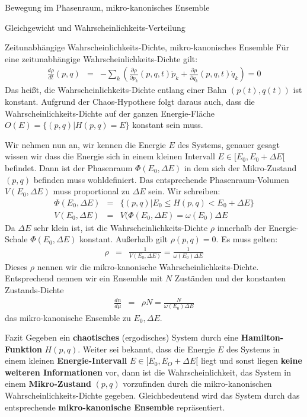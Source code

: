 \begin{chapter}{\titlestr}
\begin{section}{Bewegung im Phasenraum, mikro-kanonisches Ensemble}
\begin{subsection}{Gleichgewicht und Wahrscheinlichkeits-Verteilung}
\begin{subsubsection}{Zeitunabhängige Wahrscheinlichkeits-Dichte, mikro-kanonisches Ensemble}
Für eine zeitunabhängige Wahrscheinlichkeits-Dichte gilt:
\begin{eqnarray*}
\frac{d\rho}{dt}(p,q) &=& -\sum_k\left(\frac{\partial \rho}{\partial \dot{p}_k}(p,q,t)\dot{p}_k
+\frac{\partial \rho}{\partial \dot{q}_k}(p,q,t)\dot{q}_k
\right) =0
\end{eqnarray*}
Das heißt, die Wahrscheinlichkeits-Dichte entlang einer Bahn $(p(t),q(t))$ ist konstant.
Aufgrund der Chaos-Hypothese
folgt daraus auch, dass die Wahrscheinlichkeits-Dichte auf der ganzen Energie-Fläche $O(E)=\{(p,q)|H(p,q)=E\}$ konstant sein muss.
 
Wir nehmen nun an, wir kennen die Energie $E$ des Systems, genauer gesagt wissen wir dass die Energie
sich in einem kleinen Intervall $E\in [E_0,E_0+\Delta E[$ befindet. Dann ist der Phasenraum $\Phi(E_0,\Delta E)$
in dem sich der Mikro-Zustand $(p,q)$ befinden muss wohldefiniert. Das entsprechende Phasenraum-Volumen $V(E_0,\Delta E)$ muss proportional zu $\Delta E$ sein. Wir schreiben:
\begin{eqnarray}
\label{omega_def}
\Phi(E_0,\Delta E) &=& \{ (p,q) | E_0 \le H(p,q) < E_0+\Delta E\}\\
V(E_0,\Delta E) &=& V(\Phi(E_0,\Delta E) = \omega(E_0)\Delta E
\end{eqnarray}
Da $\Delta E$ sehr klein ist, ist die Wahrscheinlichkeits-Dichte $\rho$ innerhalb der Energie-Schale $\Phi(E_0,\Delta E)$ konstant.
Außerhalb gilt $\rho(p,q)=0$. Es muss gelten:
\begin{eqnarray*}
\rho &=& \frac{1}{V(E_0,\Delta E)}=\frac{1}{\omega(E_0)\Delta E}
\end{eqnarray*}
Dieses $\rho$ nennen wir die mikro-kanonische  Wahrscheinlichkeits-Dichte. Entsprechend nennen wir ein Ensemble mit $N$ Zuständen und der konstanten Zustands-Dichte
\begin{eqnarray*}
\frac{dn}{d\mu} &=& \rho N=\frac{N}{\omega(E_0)\Delta E}
\end{eqnarray*}
das mikro-kanonische Ensemble zu $E_0,\Delta E$.
\end{subsubsection}
\end{subsection}

\begin{subsection}{Fazit}
Gegeben ein \textbf{chaotisches} (ergodisches) System durch eine \textbf{Hamilton-Funktion} $H(p,q)$. Weiter sei bekannt, dass die Energie $E$
des Systems in einem kleinen \textbf{Energie-Intervall} $E\in [E_0, E_O+\Delta E[$ liegt und sonst liegen \textbf{keine weiteren Informationen} vor, dann ist die Wahrscheinlichkeit, das System in einem \textbf{Mikro-Zustand} $(p,q)$ vorzufinden durch die mikro-kanonischen Wahrscheinlichkeits-Dichte gegeben.
Gleichbedeutend wird das System durch das entsprechende \textbf{mikro-kanonische Ensemble} repräsentiert.
\end{subsection}
\end{section}


\end{chapter}
